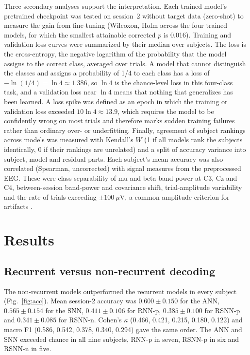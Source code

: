 \documentclass[conference]{IEEEtran}
\begin{document}
Three secondary analyses support the interpretation. Each trained model's pretrained checkpoint was tested on session~2 without target data (zero-shot) to measure the gain from fine-tuning (Wilcoxon, Holm across the four trained models, for which the smallest attainable corrected $p$ is 0.016). Training and validation loss curves were summarized by their median over subjects. The loss is the cross-entropy, the negative logarithm of the probability that the model assigns to the correct class, averaged over trials. A model that cannot distinguish the classes and assigns a probability of 1/4 to each class has a loss of $-\ln(1/4) = \ln 4 \approx 1.386$, so $\ln 4$ is the chance-level loss in this four-class task, and a validation loss near $\ln 4$ means that nothing that generalizes has been learned. A loss spike was defined as an epoch in which the training or validation loss exceeded $10\ln 4 \approx 13.9$, which requires the model to be confidently wrong on most trials and therefore marks sudden training failures rather than ordinary over- or underfitting. Finally, agreement of subject rankings across models was measured with Kendall's $W$ (1 if all models rank the subjects identically, 0 if their rankings are unrelated) and a split of accuracy variance into subject, model and residual parts. Each subject's mean accuracy was also correlated (Spearman, uncorrected) with signal measures from the preprocessed EEG. These were class separability of mu and beta band power at C3, Cz and C4, between-session band-power and covariance shift, trial-amplitude variability and the rate of trials exceeding $\pm 100~\mu$V, a common amplitude criterion for artifacts \cite{zhangluck2025}.

\section{Results}

\subsection{Recurrent versus non-recurrent decoding}

The non-recurrent models outperformed the recurrent models in every subject (Fig.~\ref{fig:acc}). Mean session-2 accuracy was $0.600 \pm 0.150$ for the ANN, $0.565 \pm 0.154$ for the SNN, $0.411 \pm 0.106$ for RNN-p, $0.385 \pm 0.100$ for RSNN-p and $0.341 \pm 0.085$ for RSNN-n. Cohen's $\kappa$ (0.466, 0.421, 0.215, 0.180, 0.122) and macro F1 (0.586, 0.542, 0.378, 0.340, 0.294) gave the same order. The ANN and SNN exceeded chance in all nine subjects, RNN-p in seven, RSNN-p in six and RSNN-n in five.
\end{document}
